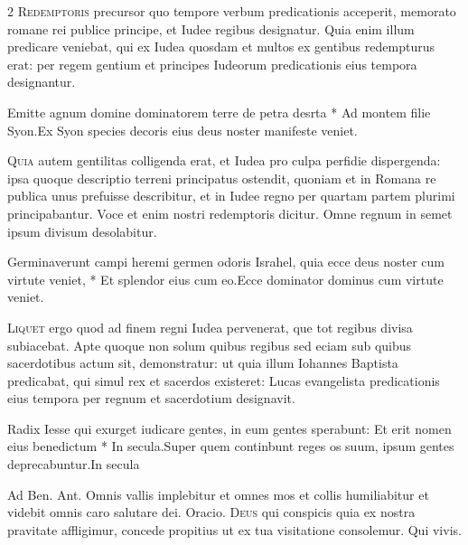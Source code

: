 \begin{multicols*}{2}
\lettrine[lines=2]{\zallmancaps \color{Blue} R}{edemptoris} precursor quo tempore verbum predicationis acceperit, memorato romane rei publice principe, et Iudee regibus designatur. Quia enim illum predicare veniebat, qui ex Iudea quosdam et multos ex gentibus redempturus erat: per regem gentium et principes Iudeorum predicationis eius tempora designantur.
\begin{responsory}
{Emitte agnum domine dominatorem terre de petra desrta * Ad montem filie Syon.}{Ex Syon species decoris eius deus noster manifeste veniet.}
\end{responsory}%
\lettrine[lines=2]{\zallmancaps \color{Red} Q}{uia} autem gentilitas colligenda erat, et Iudea pro culpa perfidie dispergenda: ipsa quoque descriptio terreni principatus ostendit, quoniam et in Romana re publica unus prefuisse describitur, et in Iudee regno per quartam partem plurimi principabantur. Voce et enim nostri redemptoris dicitur. Omne regnum in semet ipsum divisum desolabitur.
\begin{responsory}
{Germinaverunt campi heremi germen odoris Israhel, quia ecce deus noster cum virtute veniet, * Et splendor eius cum eo.}{Ecce dominator dominus cum virtute veniet.}
\end{responsory}%
\lettrine[lines=2]{\zallmancaps \color{Blue} L}{iquet} ergo quod ad finem regni Iudea pervenerat, que tot regibus divisa subiacebat. Apte quoque non solum quibus regibus sed eciam sub quibus sacerdotibus actum sit, demonstratur: ut quia illum Iohannes Baptista predicabat, qui simul rex et sacerdos existeret: Lucas evangelista predicationis eius tempora per regnum et sacerdotium designavit.
\begin{responsory-final}
{Radix Iesse qui exurget iudicare gentes, in eum gentes sperabunt: Et erit nomen eius benedictum * In secula.}{Super quem continbunt reges os suum, ipsum gentes deprecabuntur.}{In secula}
\end{responsory-final}%
{\color{Red} Ad Ben. Ant.} Omnis vallis implebitur et omnes mos et collis humiliabitur et videbit omnis caro salutare dei. {\color{Red} Oracio.}
\lettrine[lines=2]{\zallmancaps \color{Red} D}{eus} qui conspicis quia ex nostra pravitate affligimur, concede propitius ut ex tua visitatione consolemur. Qui vivis.

\end{multicols*}

